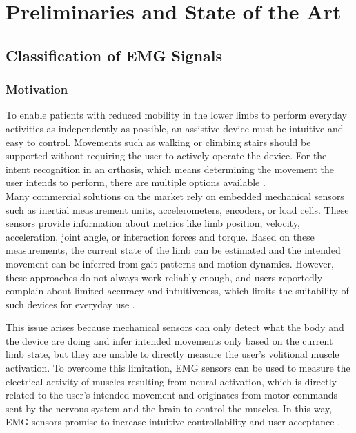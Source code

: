 \chapter{Preliminaries and State of the Art}
\label{Grundlagen}

\section{Classification of EMG Signals}

\subsection{Motivation}

To enable patients with reduced mobility in the lower limbs to perform everyday activities as independently as possible, an assistive device must be intuitive and easy to control. Movements such as walking or climbing stairs should be supported without requiring the user to actively operate the device.
For the intent recognition in an orthosis, which means determining the movement the user intends to perform, there are multiple options available \cite{cimolato_emg-driven_2022}.\\

Many commercial solutions on the market rely on embedded mechanical sensors such as inertial measurement units, accelerometers, encoders, or load cells. These sensors provide information about metrics like limb position, velocity, acceleration, joint angle, or interaction forces and torque. Based on these measurements, the current state of the limb can be estimated and the intended movement can be inferred from gait patterns and motion dynamics. However, these approaches do not always work reliably enough, and users reportedly complain about limited accuracy and intuitiveness, which limits the suitability of such devices for everyday use \cite{cimolato_emg-driven_2022}.

This issue arises because mechanical sensors can only detect what the body and the device are doing and infer intended movements only based on the current limb state, but they are unable to directly measure the user's volitional muscle activation. To overcome this limitation, EMG sensors can be used to measure the electrical activity of muscles resulting from neural activation, which is directly related to the user's intended movement and originates from motor commands sent by the nervous system and the brain to control the muscles. In this way, EMG sensors promise to increase intuitive controllability and user acceptance \cite{cimolato_emg-driven_2022}.




